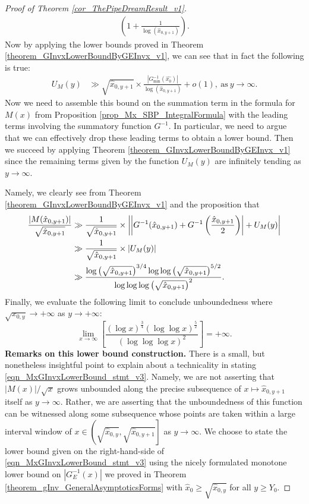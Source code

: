 \documentclass[11pt,reqno,a4letter]{article}
\numberwithin{figure}{section}
\numberwithin{table}{section}
\theoremstyle{plain}
\numberwithin{theorem}{section}
\theoremstyle{definition}
\begin{document}
\begin{proof}[Proof of Theorem \ref{cor_ThePipeDreamResult_v1}]
\begin{align*}
     \left(1 + \frac{1}{\log(\hat{x}_{0,y+1})}\right). 
\end{align*} 
Now by applying the lower bounds proved in 
Theorem \ref{theorem_GInvxLowerBoundByGEInvx_v1}, we can see that in fact the 
following is true: 
\begin{align*} 
U_M(y) & \gg \sqrt{\hat{x}_{0,y+1}} \times 
     \frac{|G_{\min}^{-1}(\hat{x_0})|}{\log(\hat{x}_{0,y+1})} 
     + o(1), \mathrm{\ as\ } y \rightarrow \infty. 
\end{align*} 
Now we need to assemble this bound on the summation term in the 
formula for $M(x)$ from 
Proposition \ref{prop_Mx_SBP_IntegralFormula} with the 
leading terms involving the summatory function $G^{-1}$. 
In particular, we need to argue that we can effectively drop these leading terms to 
obtain a lower bound. Then we succeed by applying 
Theorem \ref{theorem_GInvxLowerBoundByGEInvx_v1} since the remaining terms given by the 
function $U_M(y)$ are infinitely tending as $y \rightarrow \infty$. 

Namely, we clearly see from Theorem \ref{theorem_GInvxLowerBoundByGEInvx_v1} and the 
proposition that 
\begin{align} 
\notag 
\frac{|M(\hat{x}_{0,y+1})|}{\sqrt{\hat{x}_{0,y+1}}} & \gg \frac{1}{\sqrt{\hat{x}_{0,y+1}}} \times 
     \left\lvert \left\lvert 
     G^{-1}(\hat{x}_{0,y+1}) + G^{-1}\left(\frac{\hat{x}_{0,y+1}}{2}\right) \right\rvert + 
     U_M(y) \right\rvert \\ 
\notag 
     & \gg \frac{1}{\sqrt{\hat{x}_{0,y+1}}} \times \left\lvert U_M(y) \right\rvert \\ 
\label{eqn_MxGInvxLowerBound_stmt_v3} 
     & \gg \frac{\log\left(\sqrt{\hat{x}_{0,y+1}}\right)^{3/4} 
     \log\log\left(\sqrt{\hat{x}_{0,y+1}}\right)^{5/2}}{ 
     \log\log\log\left(\sqrt{\hat{x}_{0,y+1}}\right)^{2}}. 
\end{align} 
Finally, we evaluate the following limit to conclude unboundedness 
where $\sqrt{x_{0,y}} \rightarrow +\infty$ as $y \rightarrow +\infty$: 
\[
\lim_{x \rightarrow \infty} \left[\frac{(\log x)^{\frac{3}{4}} 
     (\log\log x)^{\frac{5}{2}}}{(\log\log\log x)^2}  
     \right] = +\infty. 
\] 
\textbf{Remarks on this lower bound construction.} 
There is a small, but nonetheless insightful point to explain about a 
technicality in stating \eqref{eqn_MxGInvxLowerBound_stmt_v3}. 
Namely, we are not asserting that 
$|M(x)| / \sqrt{x}$ grows unbounded along the precise subsequence of 
$x \mapsto \hat{x}_{0,y+1}$ itself as $y \rightarrow \infty$. 
Rather, we are asserting that the unboundedness of this function 
can be witnessed along some subsequence whose points are taken within a 
large interval window of 
$x \in \left(\sqrt{\hat{x}_{0,y}}, \sqrt{\hat{x}_{0,y+1}}\right]$ as 
$y \rightarrow \infty$. 
We choose to state the lower bound given on the right-hand-side of 
\eqref{eqn_MxGInvxLowerBound_stmt_v3} using the nicely formulated 
monotone lower bound on $|G_E^{-1}(x)|$ we proved in 
Theorem \ref{theorem_gInv_GeneralAsymptoticsForms} 
with $\hat{x}_0 \geq \sqrt{\hat{x}_{0,y}}$ for all $y \geq Y_0$. 
\end{proof} 
\end{document}
